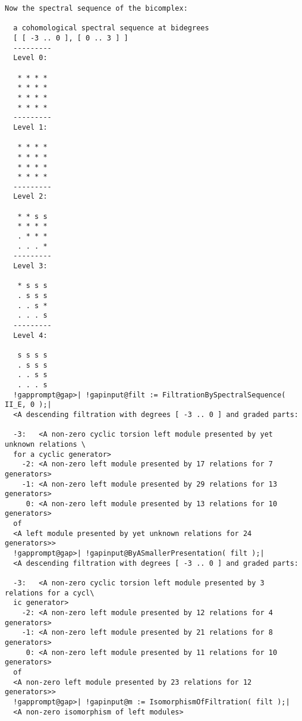 \documentclass[a4paper,11pt]{report}
\begin{document}
{{{\begin{Verbatim}[commandchars=!@|,fontsize=\small,frame=single,label=Example]
  Now the spectral sequence of the bicomplex:
  
  a cohomological spectral sequence at bidegrees
  [ [ -3 .. 0 ], [ 0 .. 3 ] ]
  ---------
  Level 0:
  
   * * * *
   * * * *
   * * * *
   * * * *
  ---------
  Level 1:
  
   * * * *
   * * * *
   * * * *
   * * * *
  ---------
  Level 2:
  
   * * s s
   * * * *
   . * * *
   . . . *
  ---------
  Level 3:
  
   * s s s
   . s s s
   . . s *
   . . . s
  ---------
  Level 4:
  
   s s s s
   . s s s
   . . s s
   . . . s
  !gapprompt@gap>| !gapinput@filt := FiltrationBySpectralSequence( II_E, 0 );|
  <A descending filtration with degrees [ -3 .. 0 ] and graded parts:
  
  -3:	<A non-zero cyclic torsion left module presented by yet unknown relations \
  for a cyclic generator>
    -2:	<A non-zero left module presented by 17 relations for 7 generators>
    -1:	<A non-zero left module presented by 29 relations for 13 generators>
     0:	<A non-zero left module presented by 13 relations for 10 generators>
  of
  <A left module presented by yet unknown relations for 24 generators>>
  !gapprompt@gap>| !gapinput@ByASmallerPresentation( filt );|
  <A descending filtration with degrees [ -3 .. 0 ] and graded parts:
  
  -3:	<A non-zero cyclic torsion left module presented by 3 relations for a cycl\
  ic generator>
    -2:	<A non-zero left module presented by 12 relations for 4 generators>
    -1:	<A non-zero left module presented by 21 relations for 8 generators>
     0:	<A non-zero left module presented by 11 relations for 10 generators>
  of
  <A non-zero left module presented by 23 relations for 12 generators>>
  !gapprompt@gap>| !gapinput@m := IsomorphismOfFiltration( filt );|
  <A non-zero isomorphism of left modules>
\end{Verbatim}
 }

 
}}
\end{document}
